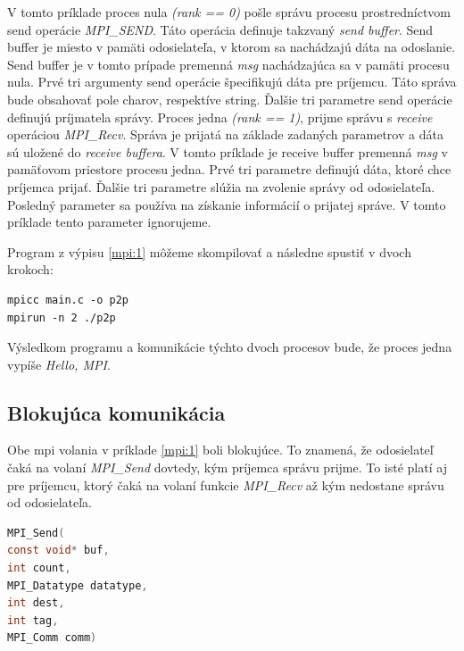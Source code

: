 V tomto príklade proces nula \textit{(rank == 0)} pošle správu procesu prostredníctvom send operácie \textit{MPI\_SEND}.
Táto operácia definuje takzvaný \textit{send buffer}. Send buffer je miesto v pamäti
odosielateľa, v ktorom sa nachádzajú dáta na odoslanie.
Send buffer je v tomto prípade premenná \textit{msg} nachádzajúca sa v pamäti procesu nula.
Prvé tri argumenty send operácie špecifikujú dáta pre príjemcu. Táto správa bude obsahovať pole charov, respektíve string.
Ďalšie tri parametre send operácie definujú príjmatela správy.
Proces jedna \textit{(rank == 1)}, prijme správu s \textit{receive} operáciou \textit{MPI\_Recv}.
Správa je prijatá na základe zadaných parametrov a dáta sú uložené do \textit{receive buffera}.
V tomto príklade je receive buffer premenná \textit{msg} v pamäťovom priestore procesu jedna.
Prvé tri parametre definujú dáta, ktoré chce príjemca prijať. Ďalšie tri parametre slúžia na zvolenie správy od odosielateľa.
Posledný parameter sa používa na získanie informácií o prijatej správe. V tomto príklade tento parameter ignorujeme.

Program z výpisu \ref{mpi:1} môžeme skompilovať a následne spustiť v dvoch krokoch:
\begin{lstlisting}
mpicc main.c -o p2p
mpirun -n 2 ./p2p
\end{lstlisting}
Výsledkom programu a komunikácie týchto dvoch procesov bude, že proces jedna vypíše \textit{Hello, MPI}.

\subsection{Blokujúca komunikácia}
Obe \acrshort{mpi} volania v príklade \ref{mpi:1} boli blokujúce.
To znamená, že odosielateľ čaká na volaní \textit{MPI\_Send} dovtedy, kým príjemca správu prijme.
To isté platí aj pre príjemcu, ktorý čaká na volaní funkcie \textit{MPI\_Recv}  až kým nedostane správu od odosielateľa.

\begin{lstlisting}[language=c, caption={MPI\_Send}, label={mpi:send}]
MPI_Send(
const void* buf,
int count,
MPI_Datatype datatype,
int dest,
int tag,
MPI_Comm comm)
\end{lstlisting}

